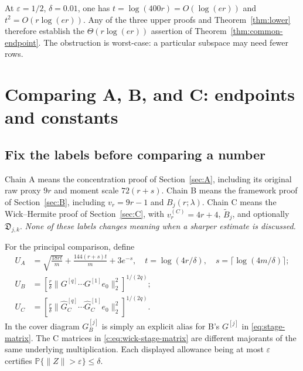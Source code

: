 \documentclass[11pt]{article}
\numberwithin{equation}{section}
\theoremstyle{definition}\newtheorem{definition}[theorem]{Definition}
\theoremstyle{remark}\newtheorem{remark}[theorem]{Remark}
\begin{document}
At $\varepsilon=1/2$, $\delta=0.01$, one has
$t=\log(400r)=O(\log(er))$ and $t^2=O(r\log(er))$.
Any of the three upper proofs and Theorem~\ref{thm:lower} therefore establish the
$\Theta(r\log(er))$ assertion of Theorem~\ref{thm:common-endpoint}.
The obstruction is worst-case: a particular subspace may need fewer rows.

\section{Comparing A, B, and C: endpoints and constants}\label{sec:comparison}
\subsection{Fix the labels before comparing a number}
Chain A means the concentration proof of Section~\ref{sec:A}, including its
original raw proxy $9r$ and moment scale $72(r+s)$. Chain B means the framework
proof of Section~\ref{sec:B}, including $v_r=9r-1$ and $B_j(r;\lambda)$.
Chain C means the Wick--Hermite proof of Section~\ref{sec:C}, with
$v_r^{(C)}=4r+4$, $\widetilde B_j$, and optionally $\mathfrak D_{j,k}$.
\emph{None of these labels changes meaning when a sharper estimate is discussed.}

For the principal comparison, define
\begin{align}
 U_A&=\sqrt{\frac{18rt}{m}}+\frac{144(r+s)t}{m}+3e^{-s},
 \quad t=\log(4r/\delta),\quad s=\lceil\log(4m/\delta)\rceil;
 \label{eq:UA}\\
 U_B&=\left[\frac r\delta\|G^{[q]}\cdots G^{[1]}e_0\|_2^2\right]^{1/(2q)};
 \label{eq:UBdynamic}\\
 U_C&=\left[\frac r\delta\|\widehat G_C^{[q]}\cdots\widehat G_C^{[1]}e_0\|_2^2\right]^{1/(2q)}.
 \label{eq:UCdynamic}
\end{align}
In the cover diagram $G_B^{[j]}$ is simply an explicit alias for B's
$G^{[j]}$ in \eqref{eq:stage-matrix}. The C matrices in \eqref{c:eq:wick-stage-matrix}
are different majorants of the same underlying multiplication. Each displayed
allowance being at most $\varepsilon$ certifies $\mathbb P\{\|Z\|>\varepsilon\}\le\delta$.
\end{document}
